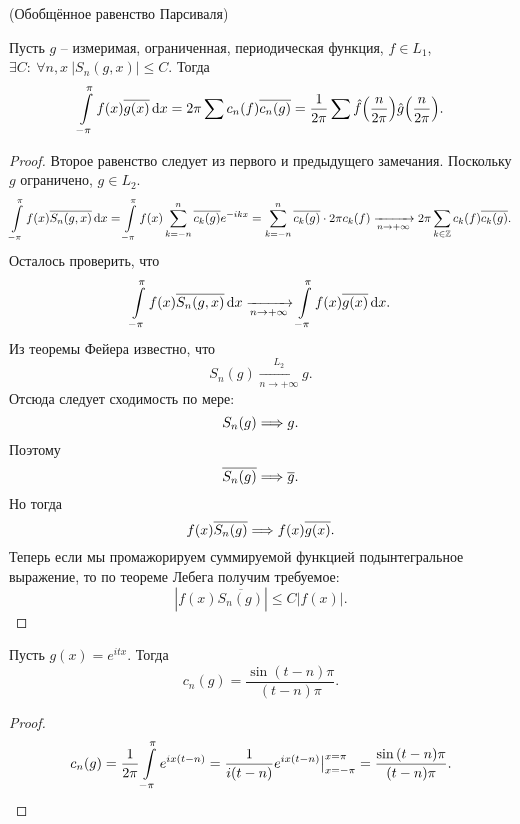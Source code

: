 \begin{lemma}(Обобщённое равенство Парсиваля)
    
    Пусть $g$ -- измеримая, ограниченная, периодическая функция, $f \in L_1$,
    $\exists C\colon~ \forall n, x~ |S_n(g, x)| \leqslant C$. Тогда
    \[
        \intl_{-\pi}^\pi{f(x) \overline{g(x)} \dd x} =
        2\pi \sum{c_n(f) \overline{c_n(g)}} =
        \frac{1}{2\pi} \sum{\hat{f}\parens*{\frac{n}{2\pi}}
        \hat{g}\parens*{\frac{n}{2\pi}}}
    .\]
\end{lemma}
\begin{proof}
    Второе равенство следует из первого и предыдущего замечания.
    Поскольку $g$ ограничено, $g \in L_2$.
    \begin{align*}
        \int\limits_{-\pi}^\pi{f(x) \overline{S_n(g, x)} \,\mathrm{d}x} = \int\limits_{-\pi}^\pi{
        f(x) \sum_{k = -n}^n{\overline{c_k(g)} e^{-ikx}}} =
        \sum_{k = -n}^n{\overline{c_k(g)} \cdot 2\pi c_k(f)}
        \xrightarrow[n \to +\infty]{} 2\pi \sum_{k \in \mathbb{Z}}{c_k(f) \overline{c_k(g)}}
    .\end{align*}
    Осталось проверить, что
    \[
        \int\limits_{-\pi}^\pi{f(x) \overline{S_n(g, x)} \,\mathrm{d}x} \xrightarrow[n \to +\infty]{}
        \int\limits_{-\pi}^\pi{f(x) \overline{g(x)} \,\mathrm{d}x}
    .\]
    Из теоремы Фейера известно, что
    \[
        S_n(g) \xrightarrow[n \to +\infty]{L_2} g
    .\]
    Отсюда следует сходимость по мере:
    \[
        S_n(g) \Longrightarrow g 
    .\]
    Поэтому
    \[
        \overline{S_n(g)} \Longrightarrow \overline{g}
    .\]
    Но тогда
    \[
        f(x) \overline{S_n(g)} \Longrightarrow f(x) \overline{g(x)}
    .\]
    Теперь если мы промажорируем суммируемой функцией подынтегральное выражение,
    то по теореме Лебега получим требуемое:
    \[
        |f(x) \overline{S_n(g)}| \leqslant C|f(x)|
    .\]
\end{proof}

\begin{remark}
    Пусть $g(x) = e^{itx}$. Тогда
    \[
        c_n(g) = \frac{\sin{(t - n) \pi}}{(t - n) \pi}
    .\]
\end{remark}
\begin{proof}
    \[
        c_n(g) = \frac{1}{2\pi} \int\limits_{-\pi}^\pi{e^{ix (t - n)}} =
        \frac{1}{i(t - n)} e^{ix (t - n)}\big|_{x = -\pi}^{x = \pi} =
        \frac{\sin{(t - n) \pi}}{(t - n) \pi}
    .\]
\end{proof}

